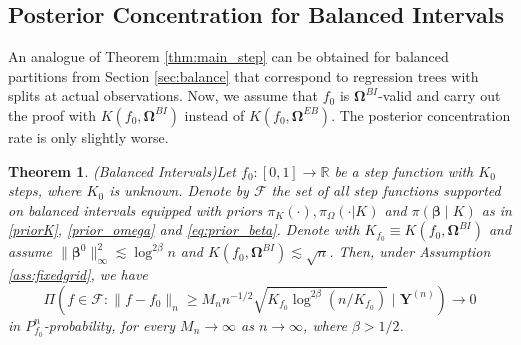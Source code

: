 \documentclass{article}
\newcommand{\1}{\mathbb{I}}
\newcommand{\bm}[1]{\boldsymbol{#1}}
\newcommand{\Y}{\bm{Y}}
\def\b{\bm{\beta}}
\def\Y{\bm{Y}}
\def\b{\bm{\beta}}
\newtheorem{theorem}{Theorem}[section]
\theoremstyle{assumption}
\begin{document}
\subsection{Posterior Concentration for Balanced Intervals}
An analogue of Theorem \ref{thm:main_step} can be obtained for balanced partitions from Section \ref{sec:balance} that correspond to regression trees with splits at actual observations. Now, we assume that $f_0$ is $\bm{\Omega}^{BI}$-valid and carry out the proof with $K(f_0,\bm{\Omega}^{BI})$ instead of $K(f_0,\bm{\Omega}^{EB})$. 
The posterior concentration rate is only slightly worse.

\begin{theorem}(Balanced Intervals)\label{thm:main_step_BI}
Let $f_0 : [0,1] \to \mathbb{R}$ be a step function with $K_0$ steps, where $K_0$ is unknown. Denote by $\mathcal{F}$ the set of all step functions supported on balanced intervals equipped with priors  $\pi_K(\cdot), \pi_{\Omega}(\cdot| K)$  and $\pi(\b \mid K)$ as in \eqref{priorK}, \eqref{prior_omega} and \eqref{eq:prior_beta}.  Denote with $K_{f_0}\equiv K(f_0,\bm{\Omega}^{BI})$ and assume $\|\b^0\|^2_\infty\lesssim\log^{2\beta} n$ and $K(f_0,\bm\Omega^{BI})\lesssim \sqrt{n}$. Then, under Assumption \ref{ass:fixedgrid}, we have 
\begin{equation}\label{eq:conc}
\Pi\left( f \in \mathcal{F}: \|f - f_0\|_n \geq M_n n^{-1/2}\sqrt{K_{f_0}\log^{2\beta}(n/K_{f_0})} \mid \Y^{(n)}\right) \to 0
\end{equation}
 in $P_{f_0}^n$-probability, for every $M_n \to \infty$ as $n \to \infty$, where  $\beta>1/2$.
\end{theorem}
\end{document}
